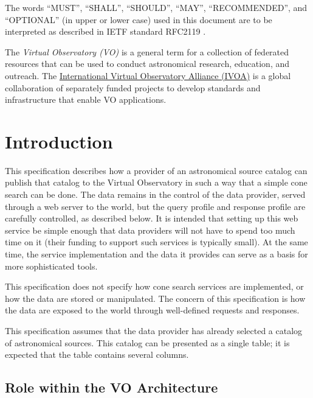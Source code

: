 \documentclass[11pt,a4paper]{ivoa} 
\begin{document}
The words ``MUST'', ``SHALL'', ``SHOULD'', ``MAY'', ``RECOMMENDED'', and
``OPTIONAL'' (in upper or lower case) used in this document are to be
interpreted as described in IETF standard RFC2119 \citep{std:RFC2119}.

The \emph{Virtual Observatory (VO)} is a general term for a collection
of federated resources that can be used to conduct astronomical
research, education, and outreach.  The
\href{http://www.ivoa.net}{International Virtual Observatory Alliance
(IVOA)} is a global collaboration of separately funded projects to
develop standards and infrastructure that enable VO applications.


\section{Introduction}

This specification describes how a provider of an astronomical source
catalog can publish that catalog to the Virtual Observatory in such a
way that a simple cone search can be done. The data remains in the
control of the data provider, served through a web server to the world,
but the query profile and response profile are carefully controlled, as
described below. It is intended that setting up this web service be
simple enough that data providers will not have to spend too much time
on it (their funding to support such services is typically small). At
the same time, the service implementation and the data it provides can
serve as a basis for more sophisticated tools.

This specification does not specify how cone search services are
implemented, or how the data are stored or manipulated. The concern of
this specification is how the data are exposed to the world through
well-defined requests and responses.

This specification assumes that the data provider has already selected a
catalog of astronomical sources. This catalog can be presented as a
single table; it is expected that the table contains several columns.

\subsection{Role within the VO Architecture}
\end{document}
